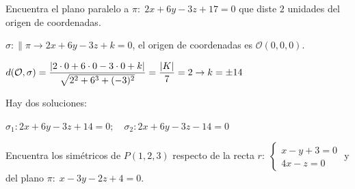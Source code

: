 \begin{ejre}
	Encuentra el plano paralelo a $\pi:\; 2x+6y-3z+17=0$ que diste $2$ unidades del origen de coordenadas.
\end{ejre}
\begin{proofw}\renewcommand{\qedsymbol}{$\diamond$}	
\noindent $\sigma:\parallel \pi \to 2x+6y-3z+k=0$, el origen de coordenadas es $\mathcal O(0,0,0)$.

\noindent $d(\mathcal O,\sigma)=\dfrac{\abs{2\cdot 0+6\cdot 0-3\cdot 0+k}}{\sqrt{2^2+6^3+(-3)^2}}=\dfrac{\abs{K}}{7}=2\to k=\pm 14$

\noindent Hay dos soluciones: 

\noindent $\sigma_1:2x+6y-3z+14=0;\quad \sigma_2:2x+6y-3z-14=0$
\end{proofw}


\begin{ejre}
	Encuentra los simétricos de $P(1,2,3)$ respecto de la recta $r:\; \begin{cases}x-y+3=0\\4x-z=0\end{cases}$ y del plano $\pi:\; x-3y-2z+4=0$.
\end{ejre}
